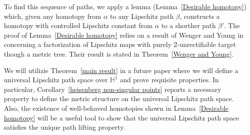 \documentclass{article}
\theoremstyle{definition}
\theoremstyle{remark}
\def\H{\mathbb{H}}
\def\H{\mathbb{H}}
\newcommand{\length}[1]{\ell}%
\newcommand{\core}[1]{{#1}_\infty}
\DeclareMathOperator{\Lip}{Lip}
\begin{document}
To find this sequence of paths, we apply a lemma (Lemma~\ref{Desirable homotopy}) which, given any homotopy from $\alpha$ to any Lipschitz path $\beta$, constructs a homotopy with controlled Lipschitz constant from $\alpha$ to a shorther path $\beta'$. The proof of Lemma~\ref{Desirable homotopy} relies on a result of Wenger and Young in \cite{Weg} concerning a factorization of Lipschitz maps with purely 2-unrectifiable target though a metric tree. Their result is stated in Theorem~\ref{Wenger and Young}.



%



We will utilizie Theorem~\ref{main result} in a future paper where we will define a universal Lipschitz path space over $\H^1$ and prove requisite properties. In particular, Corollary~\ref{heisenberg non-singular points} reports a necessary property to define the metric structure on the universal Lipschitz path space. Also, the existence of well-behaved homotopies shown in Lemma~\ref{Desirable homotopy} will be a useful tool to show that the universal Lipschitz path space satisfies the unique path lifting property.
\end{document}
